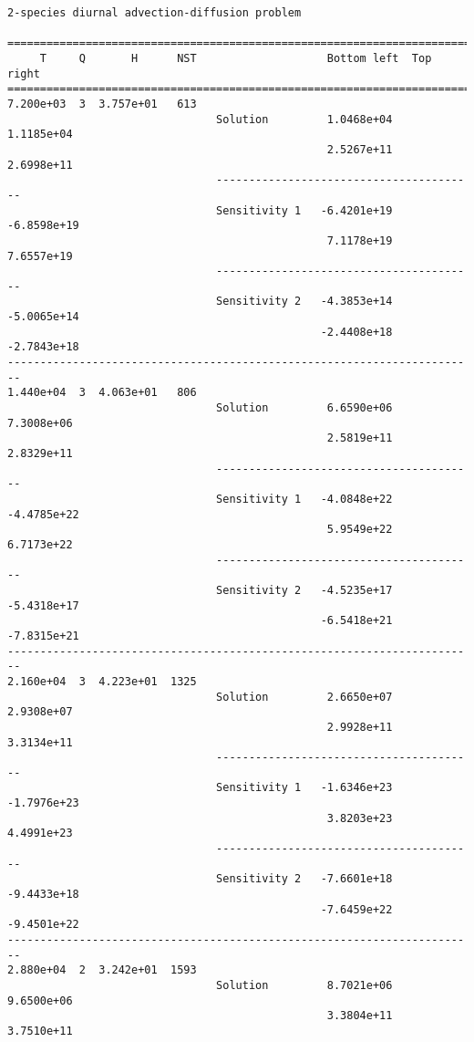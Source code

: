 \begin{verbatim}
2-species diurnal advection-diffusion problem

========================================================================
     T     Q       H      NST                    Bottom left  Top right 
========================================================================
7.200e+03  3  3.757e+01   613
                                Solution         1.0468e+04   1.1185e+04 
                                                 2.5267e+11   2.6998e+11 
                                ----------------------------------------
                                Sensitivity 1   -6.4201e+19  -6.8598e+19 
                                                 7.1178e+19   7.6557e+19 
                                ----------------------------------------
                                Sensitivity 2   -4.3853e+14  -5.0065e+14 
                                                -2.4408e+18  -2.7843e+18 
------------------------------------------------------------------------
1.440e+04  3  4.063e+01   806
                                Solution         6.6590e+06   7.3008e+06 
                                                 2.5819e+11   2.8329e+11 
                                ----------------------------------------
                                Sensitivity 1   -4.0848e+22  -4.4785e+22 
                                                 5.9549e+22   6.7173e+22 
                                ----------------------------------------
                                Sensitivity 2   -4.5235e+17  -5.4318e+17 
                                                -6.5418e+21  -7.8315e+21 
------------------------------------------------------------------------
2.160e+04  3  4.223e+01  1325
                                Solution         2.6650e+07   2.9308e+07 
                                                 2.9928e+11   3.3134e+11 
                                ----------------------------------------
                                Sensitivity 1   -1.6346e+23  -1.7976e+23 
                                                 3.8203e+23   4.4991e+23 
                                ----------------------------------------
                                Sensitivity 2   -7.6601e+18  -9.4433e+18 
                                                -7.6459e+22  -9.4501e+22 
------------------------------------------------------------------------
2.880e+04  2  3.242e+01  1593
                                Solution         8.7021e+06   9.6500e+06 
                                                 3.3804e+11   3.7510e+11 

\end{verbatim}

